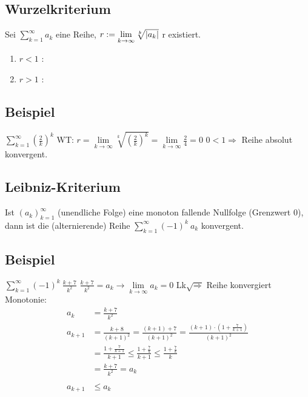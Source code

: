 \documentclass[../mainfile.tex]{subfiles}
\begin{document}
	\subsection{Wurzelkriterium}
	Sei $\sum \limits_{k=1}^\infty a_k$ eine Reihe, $r:=\lim \limits_{k\to\infty} \sqrt[k]{\abs*{a_k}}$
	r existiert.
		\begin{enumerate}[label=(\alph*)]
			\item $r < 1$ :
			\item $r > 1$ :
		\end{enumerate}
	\subsection*{Beispiel}
	$\sum \limits_{k=1}^\infty (\frac{2}{k})^k$
	\newline
	\newline
	WT: $r = \lim \limits_{k\to\infty} \sqrt[k]{(\frac{2}{k})^k} = \lim \limits_{k\to\infty} \frac{2}{4} = 0$
	\newline
	$0 < 1 \Longrightarrow$ Reihe absolut konvergent. 
	
	\subsection{Leibniz-Kriterium}
	Ist $(a_k)^\infty_{k=1}$ (unendliche Folge) eine monoton fallende Nullfolge (Grenzwert 0), dann ist die (alternierende) Reihe $\sum \limits_{k=1}^\infty (-1)^k \: a_k$ konvergent.
	\subsection*{Beispiel}
	 $\sum \limits_{k=1}^\infty (-1)^k\:\frac{k+7}{k^2}$
	\newline \newline
	$\frac{k+7}{k^2} = a_k \longrightarrow \lim \limits_{k\to\infty} a_k = 0$ 
	\newline
	Lk$\surd \Longrightarrow$ Reihe konvergiert
	\newline \newline
	Monotonie: 
	\begin{align*}
		a_k & = \frac{k+7}{k^2} \\
		a_{k+1} & = \frac{k+8}{(k+1)^2} = \frac{(k+1)+7}{(k+1)^2} = \frac{(k+1)\cdot(1+\frac{7}{k+1})}{(k+1)^2} \\
		& = \frac{1+\frac{7}{k+1}}{k+1} \leq \frac{1+\frac{7}{k}}{k+1} \leq \frac{1+\frac{7}{k}}{k} \\
		& = \frac{k+7}{k^2} = a_k \\
		\\
		a_{k+1} & \leq a_k
	\end{align*}
	\newline
	
	
\end{document}
